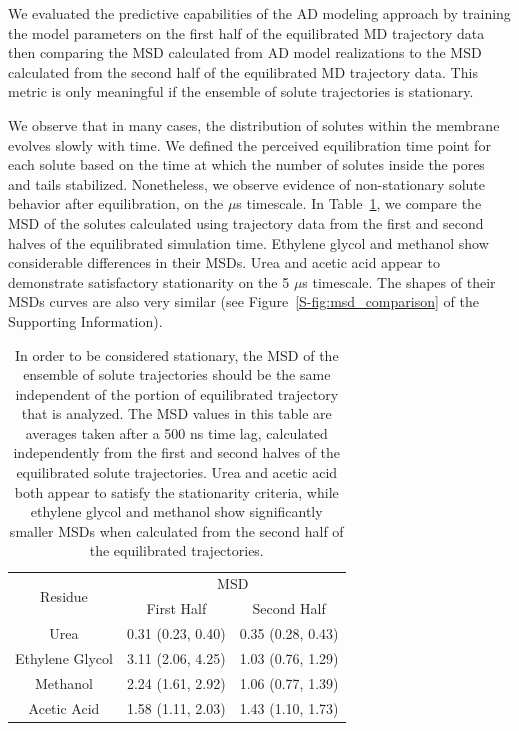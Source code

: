 \documentclass{article}
\begin{document}
  We evaluated the predictive capabilities of the AD modeling approach by training
  the model parameters on the first half of the equilibrated MD trajectory data
  then comparing the MSD calculated from AD model realizations to the MSD calculated
  from the second half of the equilibrated MD trajectory data. This metric is
  only meaningful if the ensemble of solute trajectories is stationary.
  
  We observe that in many cases, the distribution of solutes within the membrane
  evolves slowly with time. We defined the perceived equilibration time point 
  for each solute based on the time at which the number of solutes inside the
  pores and tails stabilized. Nonetheless, we observe evidence of non-stationary
  solute behavior after equilibration, on the $\mu$s timescale. In Table~\ref{table:stationarity},
  we compare the MSD of the solutes calculated using trajectory data from the 
  first and second halves of the equilibrated simulation time. Ethylene glycol 
  and methanol show considerable differences in their MSDs. Urea and acetic acid
  appear to demonstrate satisfactory stationarity on the 5 $\mu$s timescale. The
  shapes of their MSDs curves are also very similar (see Figure~\ref{S-fig:msd_comparison}
  of the Supporting Information).
  
  \begin{table}[h]
  \centering
  \begin{tabular}{|c|c|c|}
  \hline
  \multirow{2}{*}{Residue} & \multicolumn{2}{c|}{MSD}            \\\cline{2-3}
                           & First Half       & Second Half      \\\hline
  Urea                     & 0.31 (0.23, 0.40)& 0.35 (0.28, 0.43)\\\hline
  Ethylene Glycol          & 3.11 (2.06, 4.25)& 1.03 (0.76, 1.29)\\\hline
  Methanol                 & 2.24 (1.61, 2.92)& 1.06 (0.77, 1.39)\\\hline
  Acetic Acid              & 1.58 (1.11, 2.03)& 1.43 (1.10, 1.73)\\\hline
  
  \end{tabular}
  \caption{In order to be considered stationary, the MSD of the ensemble of solute trajectories
  should be the same independent of the portion of equilibrated trajectory that is
  analyzed. The MSD values in this table are averages taken after a 500 ns time lag, 
  calculated independently from the first and second halves of the equilibrated
  solute trajectories. Urea and acetic acid both appear to satisfy the stationarity
  criteria, while ethylene glycol and methanol show significantly smaller MSDs 
  when calculated from the second half of the equilibrated trajectories.}\label{table:stationarity}
  \end{table}
  
\end{document}
